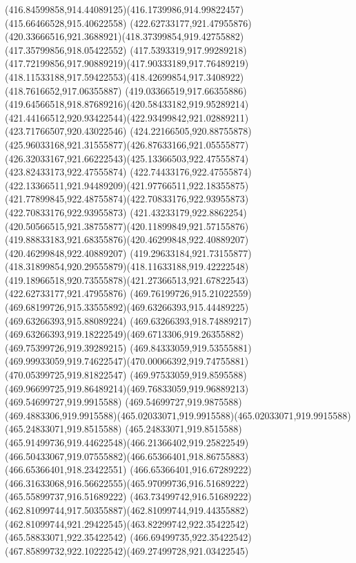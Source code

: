 {{{{				\curveto(416.84599858,914.44089125)(416.1739986,914.99822457)(415.66466528,915.40622558)
				\moveto(422.62733177,921.47955876)
				\curveto(420.33666516,921.3688921)(418.37399854,919.42755882)(417.35799856,918.05422552)
				\curveto(417.5393319,917.99289218)(417.72199856,917.90889219)(417.90333189,917.76489219)
				\curveto(418.11533188,917.59422553)(418.42699854,917.3408922)(418.7616652,917.06355887)
				\curveto(419.03366519,917.66355886)(419.64566518,918.87689216)(420.58433182,919.95289214)
				\curveto(421.44166512,920.93422544)(422.93499842,921.02889211)(423.71766507,920.43022546)
				\curveto(424.22166505,920.88755878)(425.96033168,921.31555877)(426.87633166,921.05555877)
				\curveto(426.32033167,921.66222543)(425.13366503,922.47555874)(423.82433173,922.47555874)
				\curveto(422.74433176,922.47555874)(422.13366511,921.94489209)(421.97766511,922.18355875)
				\curveto(421.77899845,922.48755874)(422.70833176,922.93955873)(422.70833176,922.93955873)
				\curveto(421.43233179,922.8862254)(420.50566515,921.38755877)(420.11899849,921.57155876)
				\curveto(419.88833183,921.68355876)(420.46299848,922.40889207)(420.46299848,922.40889207)
				\curveto(419.29633184,921.73155877)(418.31899854,920.29555879)(418.11633188,919.42222548)
				\curveto(419.18966518,920.73555878)(421.27366513,921.67822543)(422.62733177,921.47955876)
				\moveto(469.76199726,915.21022559)
				\curveto(469.68199726,915.33555892)(469.63266393,915.44489225)(469.63266393,915.88089224)
				\lineto(469.63266393,918.74889217)
				\curveto(469.63266393,919.18222549)(469.6713306,919.26355882)(469.75399726,919.39289215)
				\curveto(469.84333059,919.53555881)(469.99933059,919.74622547)(470.00066392,919.74755881)
				\lineto(470.05399725,919.81822547)
				\lineto(469.97533059,919.8595588)
				\curveto(469.96699725,919.86489214)(469.76833059,919.96889213)(469.54699727,919.9915588)
				\lineto(469.54699727,919.9875588)
				\curveto(469.4883306,919.9915588)(465.02033071,919.9915588)(465.02033071,919.9915588)
				\lineto(465.24833071,919.8515588)
				\curveto(465.24833071,919.8515588)(465.91499736,919.44622548)(466.21366402,919.25822549)
				\curveto(466.50433067,919.07555882)(466.65366401,918.86755883)(466.65366401,918.23422551)
				\lineto(466.65366401,916.67289222)
				\curveto(466.31633068,916.56622555)(465.97099736,916.51689222)(465.55899737,916.51689222)
				\curveto(463.73499742,916.51689222)(462.81099744,917.50355887)(462.81099744,919.44355882)
				\curveto(462.81099744,921.29422545)(463.82299742,922.35422542)(465.58833071,922.35422542)
				\curveto(466.69499735,922.35422542)(467.85899732,922.10222542)(469.27499728,921.03422545)
}}}}

